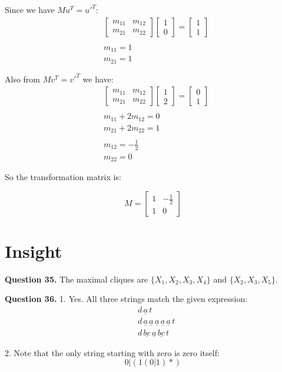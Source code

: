 \documentclass[10pt,a4paper]{article}
\newcommand{\question}[1]{\bigskip \noindent \textbf{Question #1.}}
\begin{document}
Since we have $M u^T = u'^T$:
\begin{align*}
&\begin{bmatrix}
m_{11} & m_{12} \\
m_{21} & m_{22}
\end{bmatrix}
\begin{bmatrix}
1 \\
0
\end{bmatrix}
= 
\begin{bmatrix}
1 \\
1
\end{bmatrix} \\
\\
& m_{11} = 1 \\
& m_{21} = 1
\end{align*}

Also from  $M v^T = v'^T$ we have:
\begin{align*}
&\begin{bmatrix}
m_{11} & m_{12} \\
m_{21} & m_{22}
\end{bmatrix}
\begin{bmatrix}
1 \\
2
\end{bmatrix}
= 
\begin{bmatrix}
0 \\
1
\end{bmatrix} \\
\\
& m_{11} + 2 m_{12} = 0 \\
& m_{21} + 2 m_{22} = 1 \\
\\
&m_{12} = - \frac{1}{2} \\
&m_{22} = 0
\end{align*}

So the transformation matrix is:
\begin{center}
\begin{equation*}
M =
\begin{bmatrix}
1 & -\frac{1}{2} \\
1 & 0
\end{bmatrix}
\end{equation*}
\end{center}


\section{Insight}

\question{35} The maximal cliques are $\{X_1, X_2, X_3, X_4\}$ and $\{X_2, X_3, X_5\}$.

\question{36}
1. Yes. All three strings match the given expression:
\begin{align*}
&d \, \underline{a} \, t\\
&d \, \underline{a} \, \underline{a} \, \underline{a} \, \underline{a} \, \underline{a} \, t\\
&d \, \underline{bc} \, \underline{a} \, \underline{bc} \, t
\end{align*}

2. Note that the only string starting with zero is zero itself:
\begin{equation*}
0 | \left(1(0|1)*\right)
\end{equation*}
\end{document}
